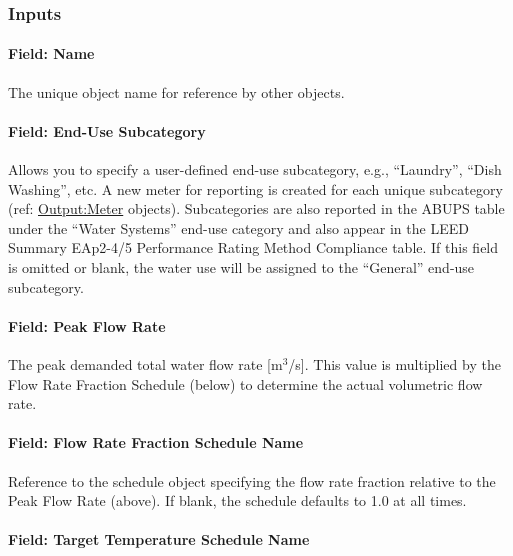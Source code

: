 \subsubsection{Inputs}\label{inputs-053}

\paragraph{Field: Name}\label{field-name-051}

The unique object name for reference by other objects.

\paragraph{Field: End-Use Subcategory}\label{field-end-use-subcategory-005}

Allows you to specify a user-defined end-use subcategory, e.g., ``Laundry'', ``Dish Washing'', etc. A new meter for reporting is created for each unique subcategory (ref: \hyperref[outputmeter-and-outputmetermeterfileonly]{Output:Meter} objects). Subcategories are also reported in the ABUPS table under the ``Water Systems'' end-use category and also appear in the LEED Summary EAp2-4/5 Performance Rating Method Compliance table. If this field is omitted or blank, the water use will be assigned to the ``General'' end-use subcategory.

\paragraph{Field: Peak Flow Rate}\label{field-peak-flow-rate-000}

The peak demanded total water flow rate {[}m\(^{3}\)/s{]}. This value is multiplied by the Flow Rate Fraction Schedule (below) to determine the actual volumetric flow rate.

\paragraph{Field: Flow Rate Fraction Schedule Name}\label{field-flow-rate-fraction-schedule-name-000}

Reference to the schedule object specifying the flow rate fraction relative to the Peak Flow Rate (above). If blank, the schedule defaults to 1.0 at all times.

\paragraph{Field: Target Temperature Schedule Name}\label{field-target-temperature-schedule-name}

